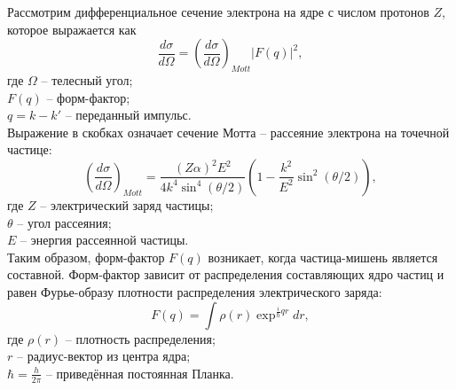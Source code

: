 \documentclass{extreport}
\begin{document}
Рассмотрим дифференциальное сечение электрона на ядре с числом протонов $Z$, которое выражается как 
\begin{equation}
    \frac{d\sigma}{d\Omega} = ( \frac{d\sigma}{d\Omega})_{Mott} |F(q)|^2 ,
\end{equation}
где $\Omega$ -- телесный угол; \\ $F(q)$ -- форм-фактор; \\ $q = k-k'$ -- переданный импульс.\\ Выражение в скобках означает сечение Мотта -- рассеяние электрона на точечной частице:
\begin{equation}
    (\frac{d\sigma}{d\Omega})_{Mott} = \frac{(Z\alpha)^2 E^2}{4k^4 \sin^4 (\theta/2)} (1- \frac{k^2}{E^2} \sin^2(\theta/2)),
\end{equation}
где $Z$ -- электрический заряд частицы; \\ $\theta$ -- угол рассеяния; \\ $E$ -- энергия рассеянной частицы. \\ Таким образом, форм-фактор $F(q)$ возникает, когда частица-мишень является составной. Форм-фактор зависит от распределения составляющих ядро частиц и равен Фурье-образу плотности распределения электрического заряда:
\begin{equation}
    F(q) = \int \rho(r) \exp^{\frac{i}{\hbar}qr}dr,
\end{equation}
где $\rho(r)$ -- плотность распределения; \\ $r$ -- радиус-вектор из центра ядра; \\ $\hbar = \frac{h}{2\pi}$ -- приведённая постоянная Планка.
\end{document}
